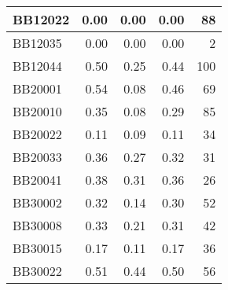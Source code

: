 \begin{table}[htbp]
\begin{tabular}{|l|r|r|r||r|}
		\hline
		BB12022 & \cellcolor[rgb]{ .988,  1,  .992}0.00 & \cellcolor[rgb]{ .988,  1,  .992}0.00 & \cellcolor[rgb]{ .988,  1,  .992}0.00 & \cellcolor[rgb]{ .976,  .482,  .494}88 \\
		\hline
		BB12035 & \cellcolor[rgb]{ .988,  1,  .992}0.00 & \cellcolor[rgb]{ .988,  1,  .992}0.00 & \cellcolor[rgb]{ .988,  1,  .992}0.00 & \cellcolor[rgb]{ .988,  .988,  1}2 \\
		\hline
		BB12044 & \cellcolor[rgb]{ .988,  1,  .992}0.50 & \cellcolor[rgb]{ .384,  .745,  .478}0.25 & \cellcolor[rgb]{ .847,  .941,  .871}0.44 & \cellcolor[rgb]{ .973,  .412,  .42}100 \\
		\hline
		BB20001 & \cellcolor[rgb]{ .988,  1,  .992}0.54 & \cellcolor[rgb]{ .384,  .745,  .478}0.08 & \cellcolor[rgb]{ .886,  .957,  .906}0.46 & \cellcolor[rgb]{ .98,  .596,  .604}69 \\
		\hline
		BB20010 & \cellcolor[rgb]{ .988,  1,  .992}0.35 & \cellcolor[rgb]{ .384,  .745,  .478}0.08 & \cellcolor[rgb]{ .863,  .945,  .886}0.29 & \cellcolor[rgb]{ .976,  .502,  .51}85 \\
		\hline
		BB20022 & \cellcolor[rgb]{ .988,  1,  .992}0.11 & \cellcolor[rgb]{ .384,  .745,  .478}0.09 & \cellcolor[rgb]{ .969,  .992,  .976}0.11 & \cellcolor[rgb]{ .984,  .804,  .812}34 \\
		\hline
		BB20033 & \cellcolor[rgb]{ .988,  1,  .992}0.36 & \cellcolor[rgb]{ .384,  .745,  .478}0.27 & \cellcolor[rgb]{ .737,  .894,  .78}0.32 & \cellcolor[rgb]{ .984,  .82,  .831}31 \\
		\hline
		BB20041 & \cellcolor[rgb]{ .988,  1,  .992}0.38 & \cellcolor[rgb]{ .384,  .745,  .478}0.31 & \cellcolor[rgb]{ .839,  .937,  .867}0.36 & \cellcolor[rgb]{ .988,  .847,  .859}26 \\
		\hline
		BB30002 & \cellcolor[rgb]{ .988,  1,  .992}0.32 & \cellcolor[rgb]{ .384,  .745,  .478}0.14 & \cellcolor[rgb]{ .902,  .961,  .918}0.30 & \cellcolor[rgb]{ .98,  .694,  .706}52 \\
		\hline
		BB30008 & \cellcolor[rgb]{ .988,  1,  .992}0.33 & \cellcolor[rgb]{ .384,  .745,  .478}0.21 & \cellcolor[rgb]{ .859,  .945,  .882}0.31 & \cellcolor[rgb]{ .984,  .753,  .765}42 \\
		\hline
		BB30015 & \cellcolor[rgb]{ .988,  1,  .992}0.17 & \cellcolor[rgb]{ .384,  .745,  .478}0.11 & \cellcolor[rgb]{ .969,  .992,  .976}0.17 & \cellcolor[rgb]{ .984,  .788,  .8}36 \\
		\hline
		BB30022 & \cellcolor[rgb]{ .988,  1,  .992}0.51 & \cellcolor[rgb]{ .384,  .745,  .478}0.44 & \cellcolor[rgb]{ .91,  .965,  .925}0.50 & \cellcolor[rgb]{ .98,  .675,  .682}56 \\

\end{tabular}
\end{table}
